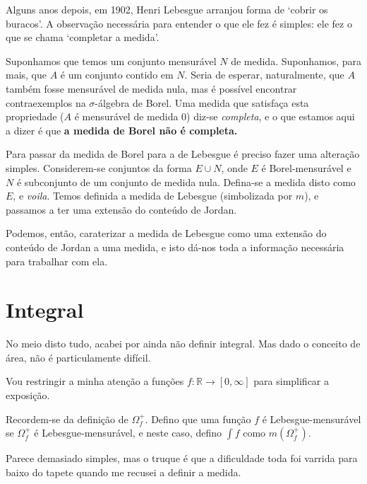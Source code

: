 \documentclass{article}
\newcommand{\R}{\mathbb{R}}
\begin{document}
Alguns anos depois, em 1902, Henri Lebesgue arranjou forma de `cobrir os buracos'. A observação necessária para entender o que ele fez é simples: ele fez o que se chama `completar a medida'.

Suponhamos que temos um conjunto mensurável $N$ de medida. Suponhamos, para mais, que $A$ é um conjunto contido em $N$. Seria de esperar, naturalmente, que $A$ também fosse mensurável de medida nula, mas é possível encontrar contraexemplos na $\sigma$-álgebra de Borel. Uma medida que satisfaça esta propriedade ($A$ é mensurável de medida 0) diz-se \emph{completa}, e o que estamos aqui a dizer é que \textbf{a medida de Borel não é completa.}

Para passar da medida de Borel para a de Lebesgue é preciso fazer uma alteração simples. Considerem-se conjuntos da forma $E \cup N$, onde $E$ é Borel-mensurável e $N$ é subconjunto de um conjunto de medida nula. Defina-se a medida disto como $E$, e \textit{voila}. Temos definida a medida de Lebesgue (simbolizada por $m$), e passamos a ter uma extensão do conteúdo de Jordan.

Podemos, então, caraterizar a medida de Lebesgue como uma extensão do conteúdo de Jordan a uma medida, e isto dá-nos toda a informação necessária para trabalhar com ela.

\section{Integral}

No meio disto tudo, acabei por ainda não definir integral. Mas dado o conceito de área, não é particulamente difícil.

Vou restringir a minha atenção a funções $f : \R \to [0, \infty]$ para simplificar a exposição.

Recordem-se da definição de $\Omega^+_f$. Defino que uma função $f$ é Lebesgue-mensurável se $\Omega^+_f$ é Lebesgue-mensurável, e neste caso, defino $\int f$ como $m(\Omega^+_f)$.

Parece demasiado simples, mas o truque é que a dificuldade toda foi varrida para baixo do tapete quando me recusei a definir a medida.
\end{document}
